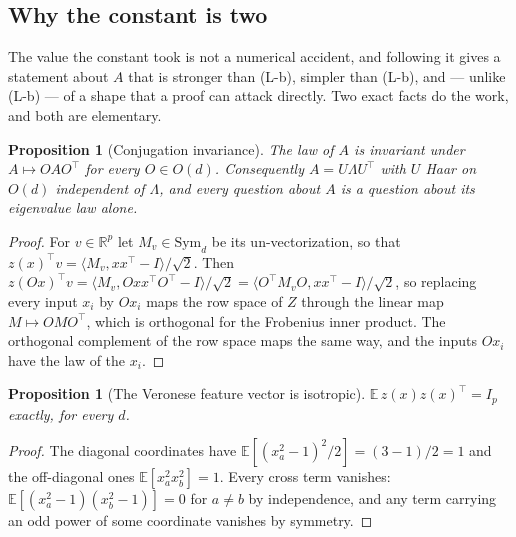 \documentclass[11pt]{article}
\newtheorem{proposition}[theorem]{Proposition}
\theoremstyle{definition}
\newcommand{\R}{\mathbb{R}}
\newcommand{\E}{\mathbb{E}}
\begin{document}
\subsection{Why the constant is two}\label{sec:semicircle}

The value the constant took is not a numerical accident, and following it gives a statement about
$A$ that is stronger than (L-b), simpler than (L-b), and --- unlike (L-b) --- of a shape that a proof
can attack directly. Two exact facts do the work, and both are elementary.

\begin{proposition}[Conjugation invariance]\label{prop:conj}
The law of $A$ is invariant under $A\mapsto OAO^\top$ for every $O\in O(d)$. Consequently $A=U\Lambda
U^\top$ with $U$ Haar on $O(d)$ independent of $\Lambda$, and every question about $A$ is a question
about its eigenvalue law alone.
\end{proposition}

\begin{proof}
For $v\in\R^p$ let $M_v\in\mathrm{Sym}_d$ be its un-vectorization, so that $z(x)^\top v=\langle
M_v,xx^\top-I\rangle/\sqrt2$. Then $z(Ox)^\top v=\langle M_v,Oxx^\top O^\top-I\rangle/\sqrt2
=\langle O^\top M_vO,xx^\top-I\rangle/\sqrt2$, so replacing every input $x_i$ by $Ox_i$ maps the row
space of $Z$ through the linear map $M\mapsto OMO^\top$, which is orthogonal for the Frobenius inner
product. The orthogonal complement of the row space maps the same way, and the inputs $Ox_i$ have
the law of the $x_i$.
\end{proof}

\begin{proposition}[The Veronese feature vector is isotropic]\label{prop:iso}
$\E\,z(x)z(x)^\top=I_p$ exactly, for every $d$.
\end{proposition}

\begin{proof}
The diagonal coordinates have $\E[(x_a^2-1)^2/2]=(3-1)/2=1$ and the off-diagonal ones
$\E[x_a^2x_b^2]=1$. Every cross term vanishes: $\E[(x_a^2-1)(x_b^2-1)]=0$ for $a\ne b$ by
independence, and any term carrying an odd power of some coordinate vanishes by symmetry.
\end{proof}
\end{document}
